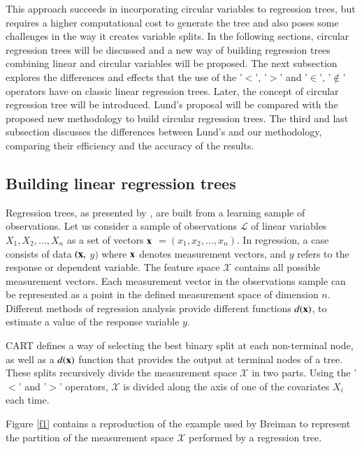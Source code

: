 \documentclass[times,twocolumn,final,authoryear]{elsarticle}
\begin{document}
This approach succeeds in incorporating circular variables to regression trees, but requires a higher computational cost to generate the tree and also poses some challenges in the way it creates variable splits. In the following sections, circular regression trees will be discussed and a new way of building regression trees combining linear and circular variables will be proposed. The next subsection explores the differences and effects that the use of the '$<$', '$>$' and '$\in$', '$\notin$' operators have on classic linear regression trees. Later, the concept of circular regression tree will be introduced. Lund's proposal will be compared with the proposed new methodology to build circular regression trees. The third and last subsection discusses the differences between Lund's and our methodology, comparing their efficiency and the accuracy of the results.

\subsection{Building linear regression trees}

Regression trees, as presented by \citep{Breimanetal1984}, are built from a learning sample of observations. Let us consider a sample of observations $\mathcal{L}$ of linear variables $ X_1, X_2, \dots, X_n $ as a set of vectors $\bf{x} $ $= (x_1, x_2, \dots, x_n)$. In regression, a case consists of data $(\bf{x},$ $y)$ where $\bf{x}$ denotes measurement vectors, and $ y $ refers to the response or dependent variable. The feature space $\mathcal{X}$ contains all possible measurement vectors. Each measurement vector in the observations sample can be represented as a point in the defined measurement space of dimension $n$. Different methods of regression analysis provide different functions $d(\bf{x})$, to estimate a value of the response variable $y$.

CART defines a way of selecting the best binary split at each non-terminal node, as well as a $d(\bf{x})$ function that provides the output at terminal nodes of a tree. These splits recursively divide the measurement space $\mathcal{X}$ in two parts. Using the '$<$' and '$>$' operators, $\mathcal{X}$ is divided along the axis of one of the covariates $X_i$ each time.

Figure \ref{f1} contains a reproduction of the example used by Breiman to represent the partition of the measurement space $\mathcal{X}$ performed by a regression tree.
\end{document}
